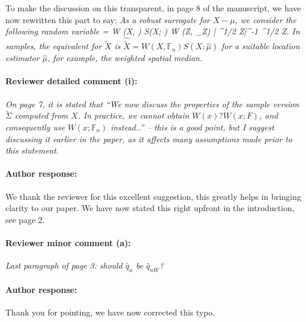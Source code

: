 \documentclass[11pt,letterpaper]{article}
\newcommand{\BF}{{\mathbb{F}}}
\def\ban#1\ean{\begin{align*}#1\end{align*}}
\theoremstyle{definition} \newtheorem{Definition}[Theorem]{Definition}
\begin{document}
To make the discussion on this transparent, in page 8 of the manuscript, we have now 
rewritten this part to say:
\textit{
As a robust surrogate for $X - \mu$, we consider the  following  random variable 
\ban
\tilde{X} = W (X, \BF) S(X; \mu) \equiv W (Z, \BF_{Z})  
| \Lambda^{1/2} Z|^{-1} \Gamma \Lambda^{1/2}  Z. 
\ean
In samples, the equivalent for $\tilde{X} $ is 
$\hat{\tilde{X}} = W (X, \BF_{n}) S(X; \hat{\mu})$ for a suitable location estimator 
$\hat{\mu}$, for example, the weighted spatial median. 
}



\paragraph{Reviewer detailed comment (i):}
\textit{
On page 7, it is stated that “We now discuss the properties of the sample version $\tilde \Sigma$ computed from $X$. In practice, we cannot obtain $W(x)?W(x; F)$, and consequently use $W(x; \BF_n)$ instead..” – this is a good point, but I suggest discussing it earlier in the paper, as it affects many assumptions made prior to this statement.}

\paragraph{Author response:}
We thank the reviewer for this excellent suggestion, this greatly helps in bringing clarity to our paper. We have now stated this right upfront in the introduction, see 
page 2. 



\paragraph{Reviewer minor comment (a):}
\textit{
Last paragraph of page 3: should $\hat q_n$ be $\hat q_{n W}$?}

\paragraph{Author response:}
Thank you for pointing, we have now corrected this typo. 


%



\end{document}
